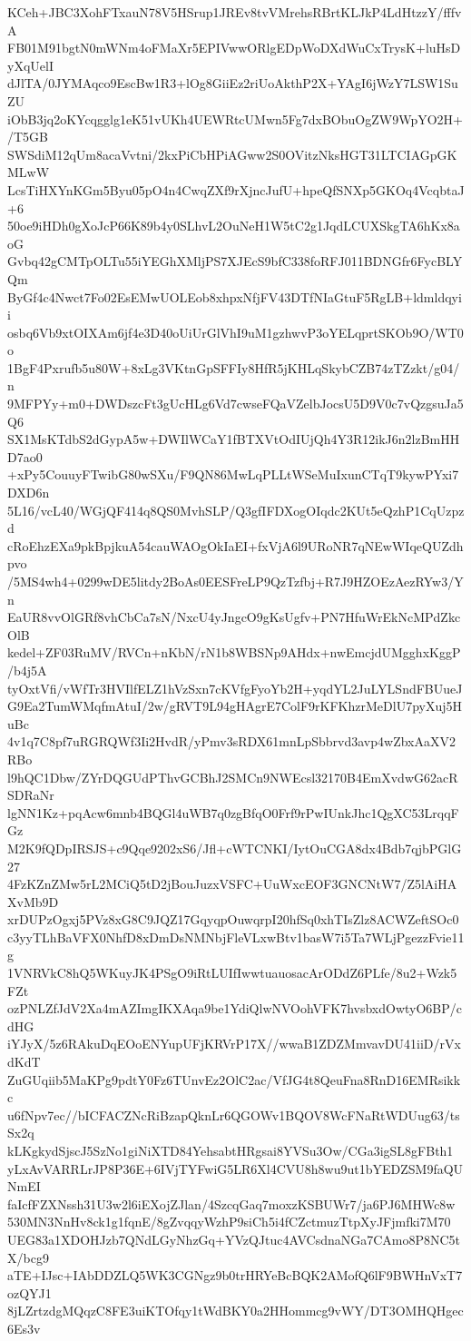 KCeh+JBC3XohFTxauN78V5HSrup1JREv8tvVMrehsRBrtKLJkP4LdHtzzY/fffvA
FB01M91bgtN0mWNm4oFMaXr5EPIVwwORlgEDpWoDXdWuCxTrysK+luHsDyXqUelI
dJlTA/0JYMAqco9EscBw1R3+lOg8GiiEz2riUoAkthP2X+YAgI6jWzY7LSW1SuZU
iObB3jq2oKYcqgglg1eK51vUKh4UEWRtcUMwn5Fg7dxBObuOgZW9WpYO2H+/T5GB
SWSdiM12qUm8acaVvtni/2kxPiCbHPiAGww2S0OVitzNksHGT31LTCIAGpGKMLwW
LcsTiHXYnKGm5Byu05pO4n4CwqZXf9rXjncJufU+hpeQfSNXp5GKOq4VcqbtaJ+6
50oe9iHDh0gXoJcP66K89b4y0SLhvL2OuNeH1W5tC2g1JqdLCUXSkgTA6hKx8aoG
Gvbq42gCMTpOLTu55iYEGhXMljPS7XJEcS9bfC338foRFJ011BDNGfr6FycBLYQm
ByGf4c4Nwct7Fo02EsEMwUOLEob8xhpxNfjFV43DTfNIaGtuF5RgLB+ldmldqyii
osbq6Vb9xtOIXAm6jf4e3D40oUiUrGlVhI9uM1gzhwvP3oYELqprtSKOb9O/WT0o
1BgF4Pxrufb5u80W+8xLg3VKtnGpSFFIy8HfR5jKHLqSkybCZB74zTZzkt/g04/n
9MFPYy+m0+DWDszcFt3gUcHLg6Vd7cwseFQaVZelbJocsU5D9V0c7vQzgsuJa5Q6
SX1MsKTdbS2dGypA5w+DWIlWCaY1fBTXVtOdIUjQh4Y3R12ikJ6n2lzBmHHD7ao0
+xPy5CouuyFTwibG80wSXu/F9QN86MwLqPLLtWSeMuIxunCTqT9kywPYxi7DXD6n
5L16/vcL40/WGjQF414q8QS0MvhSLP/Q3gfIFDXogOIqdc2KUt5eQzhP1CqUzpzd
cRoEhzEXa9pkBpjkuA54cauWAOgOkIaEI+fxVjA6l9URoNR7qNEwWIqeQUZdhpvo
/5MS4wh4+0299wDE5litdy2BoAs0EESFreLP9QzTzfbj+R7J9HZOEzAezRYw3/Yn
EaUR8vvOlGRf8vhCbCa7sN/NxcU4yJngcO9gKsUgfv+PN7HfuWrEkNcMPdZkcOlB
kedel+ZF03RuMV/RVCn+nKbN/rN1b8WBSNp9AHdx+nwEmcjdUMgghxKggP/b4j5A
tyOxtVfi/vWfTr3HVIlfELZ1hVzSxn7cKVfgFyoYb2H+yqdYL2JuLYLSndFBUueJ
G9Ea2TumWMqfmAtuI/2w/gRVT9L94gHAgrE7ColF9rKFKhzrMeDlU7pyXuj5HuBc
4v1q7C8pf7uRGRQWf3Ii2HvdR/yPmv3sRDX61mnLpSbbrvd3avp4wZbxAaXV2RBo
l9hQC1Dbw/ZYrDQGUdPThvGCBhJ2SMCn9NWEcsl32170B4EmXvdwG62acRSDRaNr
lgNN1Kz+pqAcw6mnb4BQGl4uWB7q0zgBfqO0Frf9rPwIUnkJhc1QgXC53LrqqFGz
M2K9fQDpIRSJS+c9Qqe9202xS6/Jfl+cWTCNKI/IytOuCGA8dx4Bdb7qjbPGlG27
4FzKZnZMw5rL2MCiQ5tD2jBouJuzxVSFC+UuWxcEOF3GNCNtW7/Z5lAiHAXvMb9D
xrDUPzOgxj5PVz8xG8C9JQZ17GqyqpOuwqrpI20hfSq0xhTIsZlz8ACWZeftSOc0
c3yyTLhBaVFX0NhfD8xDmDsNMNbjFleVLxwBtv1basW7i5Ta7WLjPgezzFvie11g
1VNRVkC8hQ5WKuyJK4PSgO9iRtLUIfIwwtuauosacArODdZ6PLfe/8u2+Wzk5FZt
ozPNLZfJdV2Xa4mAZImgIKXAqa9be1YdiQlwNVOohVFK7hvsbxdOwtyO6BP/cdHG
iYJyX/5z6RAkuDqEOoENYupUFjKRVrP17X//wwaB1ZDZMmvavDU41iiD/rVxdKdT
ZuGUqiib5MaKPg9pdtY0Fz6TUnvEz2OlC2ac/VfJG4t8QeuFna8RnD16EMRsikkc
u6fNpv7ec//bICFACZNcRiBzapQknLr6QGOWv1BQOV8WcFNaRtWDUug63/tsSx2q
kLKgkydSjscJ5SzNo1giNiXTD84YehsabtHRgsai8YVSu3Ow/CGa3igSL8gFBth1
yLxAvVARRLrJP8P36E+6IVjTYFwiG5LR6Xl4CVU8h8wu9ut1bYEDZSM9faQUNmEI
faIcfFZXNssh31U3w2l6iEXojZJlan/4SzcqGaq7moxzKSBUWr7/ja6PJ6MHWc8w
530MN3NnHv8ck1g1fqnE/8gZvqqyWzhP9siCh5i4fCZctmuzTtpXyJFjmfki7M70
UEG83a1XDOHJzb7QNdLGyNhzGq+YVzQJtuc4AVCsdnaNGa7CAmo8P8NC5tX/bcg9
aTE+IJsc+IAbDDZLQ5WK3CGNgz9b0trHRYeBcBQK2AMofQ6lF9BWHnVxT7ozQYJ1
8jLZrtzdgMQqzC8FE3uiKTOfqy1tWdBKY0a2HHommcg9vWY/DT3OMHQHgec6Es3v
